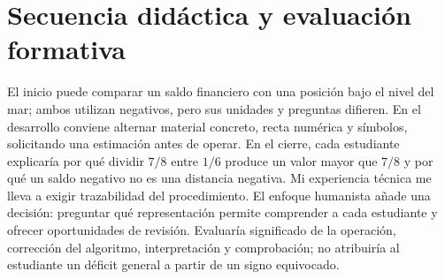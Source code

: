 \documentclass[spanish,letterpaper,oneside]{article}
\begin{document}
\section{Secuencia didáctica y evaluación formativa}
El inicio puede comparar un saldo financiero con una posición bajo el nivel del mar; ambos utilizan negativos, pero sus unidades y preguntas difieren. En el desarrollo conviene alternar material concreto, recta numérica y símbolos, solicitando una estimación antes de operar. En el cierre, cada estudiante explicaría por qué dividir $7/8$ entre $1/6$ produce un valor mayor que $7/8$ y por qué un saldo negativo no es una distancia negativa.
Mi experiencia técnica me lleva a exigir trazabilidad del procedimiento. El enfoque humanista añade una decisión: preguntar qué representación permite comprender a cada estudiante y ofrecer oportunidades de revisión. Evaluaría significado de la operación, corrección del algoritmo, interpretación y comprobación; no atribuiría al estudiante un déficit general a partir de un signo equivocado.
\end{document}
